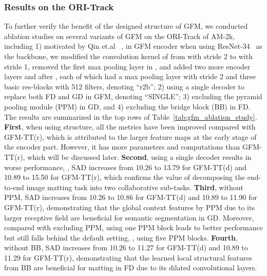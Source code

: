\documentclass[twocolumn]{svjour3}
\begin{document}
\subsubsection{Results on the ORI-Track} 
To further verify the benefit of the designed structure of GFM, we conducted ablation studies on several variants of GFM on the ORI-Track of AM-2k, including 1) motivated by Qin et.al ~\citep{Qin_2019_CVPR}, in GFM encoder when using ResNet-34~\citep{he2016deep} as the backbone, we modified the convolution kernel of  from  with stride 2 to  with stride 1, removed the first max pooling layer in , and added two more encoder layers  and  after , each of which had a max pooling layer with stride 2 and three basic res-blocks with 512 filters, denoting ``r2b''; 2) using a single decoder to replace both FD and GD in GFM, denoting ``SINGLE''; 3) excluding the pyramid pooling module (PPM) in GD, and 4) excluding the bridge block (BB) in FD. The results are summarized in the top rows of Table~\ref{tab:gfm_ablation_study}. \textbf{First}, when using  structure, all the metrics have been improved compared with GFM-TT(r), which is attributed to the larger feature maps at the early stage of the encoder part. However, it has more parameters and computations than GFM-TT(r), which will be discussed later. \textbf{Second}, using a single decoder results in worse performance, , SAD increases from 10.26 to 13.79 for GFM-TT(d) and 10.89 to 15.50 for GFM-TT(r), which confirms the value of decomposing the end-to-end image matting task into two collaborative sub-tasks. \textbf{Third}, without PPM, SAD increases from 10.26 to 10.86 for GFM-TT(d) and 10.89 to 11.90 for GFM-TT(r), demonstrating that the global context features by PPM due to its larger receptive field are beneficial for semantic segmentation in GD. Moreover, compared with excluding PPM, using one PPM block leads to better performance but still falls behind the default setting, , using five PPM blocks. \textbf{Fourth}, without BB, SAD increases from 10.26 to 11.27 for GFM-TT(d) and 10.89 to 11.29 for GFM-TT(r), demonstrating that the learned local structural features from BB are beneficial for matting in FD due to its dilated convolutional layers.
\end{document}
